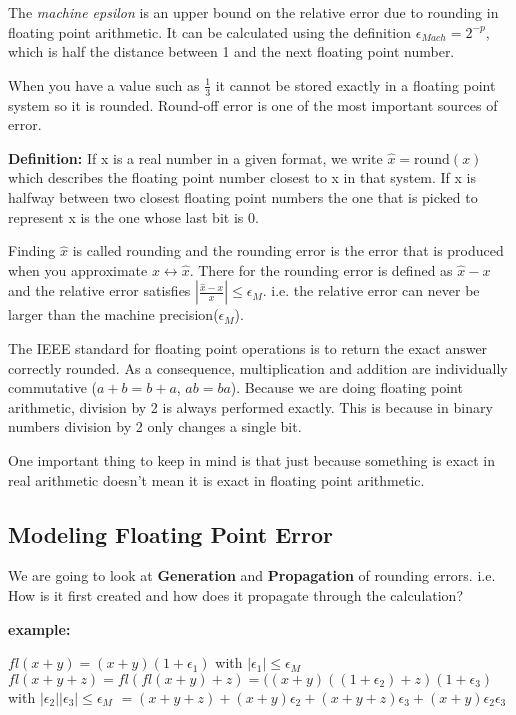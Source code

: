 \documentclass{article}
\newcommand{\n}{\newline}
\begin{document}
\begin{flushleft}
	The \textit{machine epsilon} is an upper bound on the relative error due to rounding in floating point arithmetic.  It can be calculated using the definition $\epsilon_{Mach}=2^{-p}$, which is half the distance between 1 and the next floating point number. \n  
	
	When you have a value such as $\frac{1}{3}$ it cannot be stored exactly in a floating point system so it is rounded.  Round-off error is one of the most important sources of error. \n
	
	\textbf{Definition: }If x is a real number in a given format, we write $\hat{x}=\text{round}(x)$ which describes the floating point number closest to x in that system.  If x is halfway between two closest floating point numbers the one that is picked to represent x is the one whose last bit is 0.  \n
	
	Finding $\hat{x}$ is called rounding and the rounding error is the error that is produced when you approximate $x\leftrightarrow\hat{x}$.  There for the rounding error is defined as $\hat{x}-x$ and the relative error satisfies $|\frac{\hat{x}-x}{x}|\leq\epsilon_{M}$.  i.e. the relative error can never be larger than the machine precision($\epsilon_{M}$). \n
	
	The IEEE standard for floating point operations is to return the exact answer correctly rounded. As a consequence, multiplication and addition are individually commutative ($a+b=b+a$, $ab=ba$).  Because we are doing floating point arithmetic, division by 2 is always performed exactly.  This is because in binary numbers division by 2 only changes a single bit.  \n
	
	One important thing to keep in mind is that just because something is exact in real arithmetic doesn't mean it is exact in floating point arithmetic. \n
	
	\subsection{Modeling Floating Point Error}
	 
	 We are going to look at \textbf{Generation} and \textbf{Propagation} of rounding errors.  i.e. How is it first created and how does it propagate through the calculation?\n
	 
	 \textbf{example:}\n
	 
	 $fl(x+y)=(x+y)(1+\epsilon_{1})$ with $|\epsilon_{1}|\leq\epsilon_{M}$ \n
	 $fl(x+y+z)=fl(fl(x+y)+z) = ((x+y)((1+\epsilon_{2})+z)(1+\epsilon_{3})$ with $|\epsilon_{2}||\epsilon_{3}|\leq\epsilon_{M}$\n
	 $=(x+y+z)+(x+y)\epsilon_{2}+(x+y+z)\epsilon_{3}+(x+y)\epsilon_{2}\epsilon_{3}$\n
	 

\end{flushleft}
\end{document}
